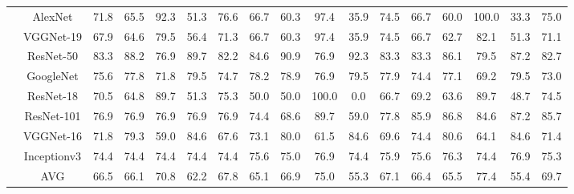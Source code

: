 \documentclass[12pt,italian]{article}
\begin{document}
\begin{tiny}
\begin{longtable}{lcccccccccccccccc}
& AlexNet & 71.8 & 65.5 & 92.3 & 51.3 & 76.6 & 66.7 & 60.3 & 97.4 & 35.9 & 74.5 & 66.7 & 60.0 & 100.0 & 33.3 & 75.0 \\ 
& VGGNet-19 & 67.9 & 64.6 & 79.5 & 56.4 & 71.3 & 66.7 & 60.3 & 97.4 & 35.9 & 74.5 & 66.7 & 62.7 & 82.1 & 51.3 & 71.1 \\ 
& ResNet-50 & 83.3 & 88.2 & 76.9 & 89.7 & 82.2 & 84.6 & 90.9 & 76.9 & 92.3 & 83.3 & 83.3 & 86.1 & 79.5 & 87.2 & 82.7 \\ 
& GoogleNet & 75.6 & 77.8 & 71.8 & 79.5 & 74.7 & 78.2 & 78.9 & 76.9 & 79.5 & 77.9 & 74.4 & 77.1 & 69.2 & 79.5 & 73.0 \\ 
& ResNet-18 & 70.5 & 64.8 & 89.7 & 51.3 & 75.3 & 50.0 & 50.0 & 100.0 &  0.0 & 66.7 & 69.2 & 63.6 & 89.7 & 48.7 & 74.5 \\ 
& ResNet-101 & 76.9 & 76.9 & 76.9 & 76.9 & 76.9 & 74.4 & 68.6 & 89.7 & 59.0 & 77.8 & 85.9 & 86.8 & 84.6 & 87.2 & 85.7 \\ 
& VGGNet-16 & 71.8 & 79.3 & 59.0 & 84.6 & 67.6 & 73.1 & 80.0 & 61.5 & 84.6 & 69.6 & 74.4 & 80.6 & 64.1 & 84.6 & 71.4 \\ 
& Inceptionv3 & 74.4 & 74.4 & 74.4 & 74.4 & 74.4 & 75.6 & 75.0 & 76.9 & 74.4 & 75.9 & 75.6 & 76.3 & 74.4 & 76.9 & 75.3 \\ 
\hline
& AVG & 66.5 & 66.1 & 70.8 & 62.2 & 67.8 & 65.1 & 66.9 & 75.0 & 55.3 & 67.1 & 66.4 & 65.5 & 77.4 & 55.4 & 69.7 \\ 
\hline
\bottomrule
\end{longtable} 

 \pagebreak 
\end{tiny} 
 
\end{document}
